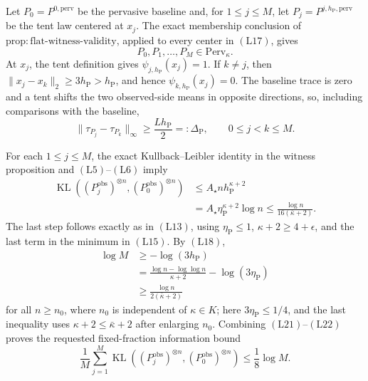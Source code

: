 Let \(P_0=P^{0,\mathrm{perv}}\) be the pervasive baseline and, for
\(1\leq j\leq M\), let \(P_j=P^{j,h_{\mathrm P},\mathrm{perv}}\) be the tent law centered at \(x_j\).  The exact membership conclusion of
\(\mathrm{prop{:}flat\text{-}witness\text{-}validity}\), applied to every center in \((\mathrm{L17})\), gives
\[
 P_0,P_1,\ldots,P_M\in\mathrm{Perv}_\kappa.
 \tag{L19}
\]
At \(x_j\), the tent definition gives \(\psi_{j,h_{\mathrm P}}(x_j)=1\).  If \(k\ne j\), then \(\|x_j-x_k\|_2\geq3h_{\mathrm P}>h_{\mathrm P}\), and hence \(\psi_{k,h_{\mathrm P}}(x_j)=0\).  The baseline trace is zero and a tent shifts the two observed-side means in opposite directions, so, including comparisons with the baseline,
\[
 \|\tau_{P_j}-\tau_{P_k}\|_\infty
 \geq\frac{Lh_{\mathrm P}}2=:\Delta_{\mathrm P},
 \qquad 0\leq j<k\leq M.
 \tag{L20}
\]

For each \(1\leq j\leq M\), the exact Kullback--Leibler identity in the witness proposition and \((\mathrm{L5})\)--\((\mathrm{L6})\) imply
\[
\begin{aligned}
 \operatorname{KL}\!\left((P_j^{\mathrm{obs}})^{\otimes n},
 (P_0^{\mathrm{obs}})^{\otimes n}\right)
 &\leq A_\star n h_{\mathrm P}^{\kappa+2}\\
 &=A_\star\eta_{\mathrm P}^{\kappa+2}\log n
 \leq\frac{\log n}{16(\bar\kappa+2)}.
\end{aligned}
 \tag{L21}
\]
The last step follows exactly as in \((\mathrm{L13})\), using
\(\eta_{\mathrm P}\leq1\), \(\kappa+2\geq4+\epsilon\), and the last term in the minimum in \((\mathrm{L15})\).
By \((\mathrm{L18})\),
\[
\begin{aligned}
 \log M
 &\geq -\log(3h_{\mathrm P})\\
 &=\frac{\log n-\log\log n}{\kappa+2}
   -\log(3\eta_{\mathrm P})\\
 &\geq\frac{\log n}{2(\bar\kappa+2)}
\end{aligned}
 \tag{L22}
\]
for all \(n\geq n_0\), where \(n_0\) is independent of \(\kappa\in K\); here \(3\eta_{\mathrm P}\leq1/4\), and the last inequality uses \(\kappa+2\leq\bar\kappa+2\) after enlarging \(n_0\).  Combining \((\mathrm{L21})\)--\((\mathrm{L22})\) proves the requested fixed-fraction information bound
\[
 \frac1M\sum_{j=1}^M
 \operatorname{KL}\!\left((P_j^{\mathrm{obs}})^{\otimes n},
 (P_0^{\mathrm{obs}})^{\otimes n}\right)
 \leq\frac18\log M.
 \tag{L23}
\]

